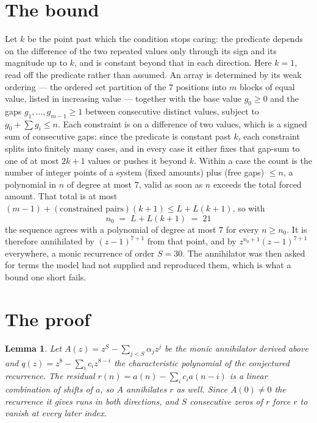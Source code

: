 \documentclass[11pt,a4paper]{article}
\theoremstyle{plain}
\newtheorem{lemma}[theorem]{Lemma}
\theoremstyle{definition}
\begin{document}
\section{The bound}

Let $k$ be the point past which the condition stops caring: the predicate depends on the
difference of the two repeated values only through its sign and its magnitude up to $k$, and is
constant beyond that in each direction. Here $k=1$, read off the predicate rather than
assumed. An array is determined by its weak ordering --- the ordered set partition of the
$7$ positions into $m$ blocks of equal value, listed in increasing value --- together with
the base value $g_0\ge0$ and the gaps $g_1,\dots,g_{m-1}\ge1$ between consecutive distinct
values, subject to $g_0+\sum g_i\le n$. Each constraint is on a difference of two values, which
is a signed sum of consecutive gaps; since the predicate is constant past $k$, each constraint
splits into finitely many cases, and in every case it either fixes that gap-sum to one of at
most $2k+1$ values or pushes it beyond $k$. Within a case the count is the number of integer
points of a system (fixed amounts) plus (free gaps) $\le n$, a polynomial in $n$ of degree at
most $7$, valid as soon as $n$ exceeds the total forced amount. That total is at most
$(m-1)+(\text{constrained pairs})(k+1)\le L+L(k+1)$, so with
\[
n_0 \;=\; L + L(k+1) \;=\; 21
\]
the sequence agrees with a polynomial of degree at most $7$ for every $n\ge n_0$. It is
therefore annihilated by $(z-1)^{7+1}$ from that point, and by $z^{n_0+1}(z-1)^{7+1}$
everywhere, a monic recurrence of order $S=30$. The annihilator was then asked for terms the
model had not supplied and reproduced them, which is what a bound one short fails.

\section{The proof}

\begin{lemma}\label{lem:crit}
Let $A(z)=z^S-\sum_{j<S}\alpha_jz^{j}$ be the monic annihilator derived above and
$q(z)=z^{8}-\sum_ic_iz^{8-i}$ the characteristic polynomial of the conjectured
recurrence. The residual $r(n)=a(n)-\sum_ic_ia(n-i)$ is a linear combination of shifts of $a$,
so $A$ annihilates $r$ as well. Since $A(0)\ne0$ the recurrence it gives runs in both
directions, and $S$ consecutive zeros of $r$ force $r$ to vanish at every later index.
\end{lemma}
\end{document}

